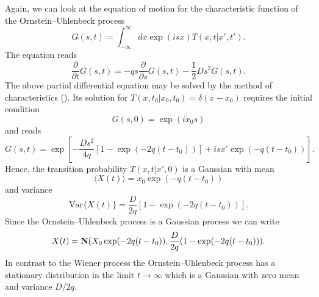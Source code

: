 Again, we can look at the equation of motion for the characteristic
function of the Ornstein--Uhlenbeck process
\begin{equation*}
G(s,t) = \int_{-\infty}^{\infty} dx \exp(isx) T(x,t|x',t').
\end{equation*}
The equation reads
\begin{equation*}
\frac{\partial}{\partial t}G(s,t) = -qs \frac{\partial}{\partial s} 
G(s,t) - \frac{1}{2} Ds^2 G(s,t).
\end{equation*}
The above partial differential equation may be solved by the 
method of characteristics (\cite{GARDINER}). Its solution
for $T(x,t_0|x_0,t_0)=\delta(x-x_0)$ requires the
initial condition 
\begin{equation*}
G(s,0) = \exp(ix_0s)
\end{equation*}
and reads
\begin{equation*}
G(s,t) = \exp\left[ -\frac{Ds^2}{4q}[1-\exp(-2q(t-t_0))] + 
 isx'\exp(-q(t-t_0)) 
\right].
\end{equation*}
Hence, the transition probability $T(x,t|x',0)$ is a Gaussian
with mean
\begin{equation}
\label{MEAN_ORNSTEIN}
\langle X(t) \rangle = x_0\exp(-q(t-t_0))
\end{equation}
and variance
\begin{equation}
\label{VAR_ORNSTEIN}
\text{Var} \{ X(t) \} = \frac{D}{2q} [1- \exp(-2q(t-t_0))].
\end{equation}
Since the Ornstein--Uhlenbeck process is a Gaussian process we can write
\begin{equation*}
X(t) = {\bf N}(X_0\exp(-2q(t-t_0)), 
     \frac{D}{2q} (1-\exp(-2q(t-t_0)) ).
\end{equation*}
In contrast to the Wiener process the Ornstein--Uhlenbeck process
has a stationary distribution in the limit $t\longrightarrow \infty$
which is a Gaussian with zero mean and variance $D/2q$.



